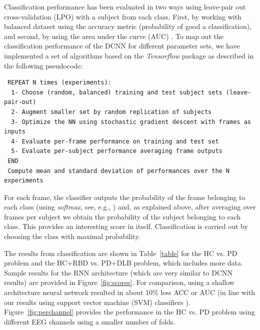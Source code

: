 \documentclass[review]{elsarticle}
\begin{document}
Classification performance has been evaluated in two ways using leave-pair out cross-validation (LPO) with a subject from each class. First, by working with balanced dataset using the accuracy metric (probability of good a classification), and second, by using the area under the curve (AUC) \citep{Airola2010}. To map out the classification performance of the DCNN for different parameter sets, we have implemented a set of algorithms based on the {\em Tensorflow} package \cite{Abadi:2016aa} as described in the following pseudocode:
{\scriptsize
\begin{verbatim} 
 REPEAT N times (experiments):
  1- Choose (random, balanced) training and test subject sets (leave-pair-out)
  2- Augment smaller set by random replication of subjects
  3- Optimize the NN using stochastic gradient descent with frames as inputs
  4- Evaluate per-frame performance on training and test set
  5- Evaluate per-subject performance averaging frame outputs
 END   
 Compute mean and standard deviation of performances over the N experiments   
\end{verbatim} 
}
For each frame, the classifier outputs  the probability of the frame belonging to each class (using {\em softmax}, see, e.g., \cite{Goodfellow2016}) and, as explained above, after averaging over frames per subject we obtain the probability of the subject belonging to each class. This provides an interesting score in itself. Classification is carried out by choosing the class with maximal  probability. 

 

The results from classification are shown in Table~\ref{table} for the HC vs. PD problem and the HC+RBD vs. PD+DLB problem, which includes more data. Sample results for the RNN architecture (which are very similar to  DCNN results) are provided in Figure~\ref{fig:scores}.
For comparison, using a shallow architecture neural network resulted in about 10\% less ACC or AUC (in line with our results using support vector machine (SVM) classifiers \cite{Soria2014:aa,Soria2016:aa}). Figure~\ref{fig:perchannel} provides the performance in the HC vs. PD problem using different EEG channels using a smaller number of folds.
\end{document}
